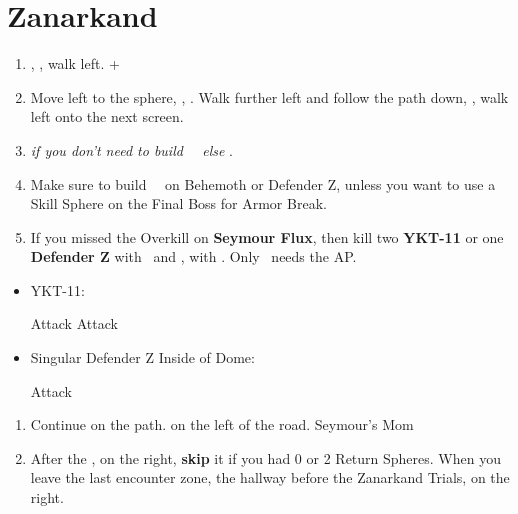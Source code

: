 \chapter{Zanarkand}
\begin{enumerate}
	\item \sd, \cs[0:50], walk left. \fmv+\cs[2:20]
	\item Move left to the sphere, \sd, \cs[1:40]. Walk further left and follow the path down, \cs[3:20], walk left onto the next screen.
	\item \formation{\tidus}{\auron}{\kimahri} \textit{if you don't need to build \rikku\ \od\ else} \formation{\tidus}{\auron}{\rikku}.
	\item Make sure to build \rikku\ \od\ on Behemoth or Defender Z, unless you want to use a Skill Sphere on the Final Boss for Armor Break.
	\item If you missed the Overkill on \textbf{Seymour Flux}, then kill two \textbf{YKT-11} or one \textbf{Defender Z} with \yuna\ and \tidus, with \formation{\tidus}{\yuna}{\auron}. Only \yuna\ needs the AP.
\end{enumerate}
\begin{encounters}
	\begin{itemize}
		\item YKT-11:
		      \begin{itemize}
			      \tidusf Attack
			      \yunaf Attack
		      \end{itemize}
		\item Singular Defender Z Inside of Dome:
		      \begin{itemize}
			      \summon{\bahamut}
			      \bahamutf Attack
		      \end{itemize}
	\end{itemize}
\end{encounters}
\begin{enumerate}[resume]
	\item Continue on the path.  on the left of the road. Seymour's Mom \cs
	\item After the \cs,  on the right, \textbf{skip} it if you had 0 or 2 Return Spheres. When you leave the last encounter zone, the hallway before the Zanarkand Trials,  on the right.
\end{enumerate}
\vfill
